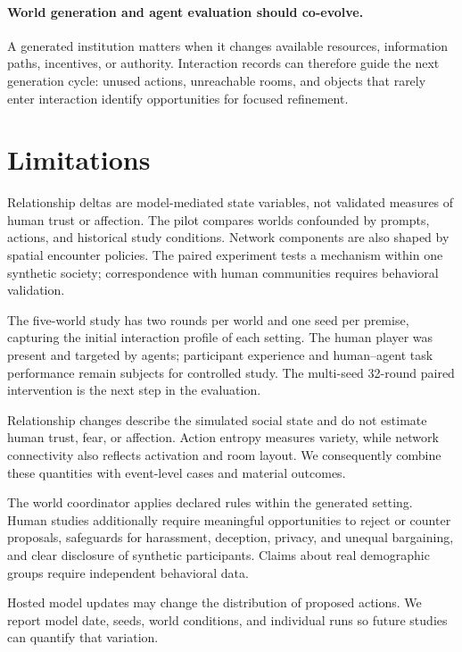 \documentclass[10pt,twocolumn]{article}
\begin{document}
\paragraph{World generation and agent evaluation should co-evolve.}
A generated institution matters when it changes available resources,
information paths, incentives, or authority. Interaction records can therefore
guide the next generation cycle: unused actions, unreachable rooms, and objects
that rarely enter interaction identify opportunities for focused refinement.

\section{Limitations}

Relationship deltas are model-mediated state variables, not validated measures
of human trust or affection. The pilot compares worlds confounded by prompts,
actions, and historical study conditions. Network components are also shaped by
spatial encounter policies. The paired experiment tests a mechanism within one
synthetic society; correspondence with human communities requires behavioral
validation.

The five-world study has two rounds per world and one seed per premise, capturing
the initial interaction profile of each setting. The human player was present
and targeted by agents; participant experience and human--agent task performance
remain subjects for controlled study. The multi-seed 32-round paired
intervention is the next step in the evaluation.

Relationship changes describe the simulated social state and do not estimate
human trust, fear, or affection. Action entropy measures variety, while network
connectivity also reflects activation and room layout. We consequently combine
these quantities with event-level cases and material outcomes.

The world coordinator applies declared rules within the generated setting.
Human studies additionally require meaningful opportunities to reject or
counter proposals, safeguards for harassment, deception, privacy, and unequal
bargaining, and clear disclosure of synthetic participants. Claims about real
demographic groups require independent behavioral data.

Hosted model updates may change the distribution of proposed actions. We report
model date, seeds, world conditions, and individual runs so future studies can
quantify that variation.
\end{document}
